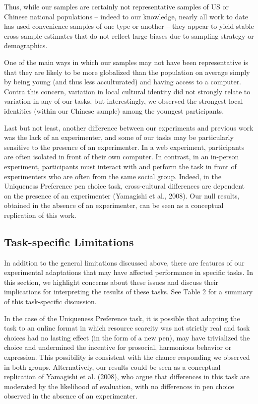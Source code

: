 \documentclass[
  man,floatsintext]{apa6}
\begin{document}
Thus, while our samples are certainly not representative samples of US or Chinese national populations -- indeed to our knowledge, nearly all work to date has used convenience samples of one type or another -- they appear to yield stable cross-sample estimates that do not reflect large biases due to sampling strategy or demographics.

One of the main ways in which our samples may not have been representative is that they are likely to be more globalized than the population on average simply by being young (and thus less acculturated) and having access to a computer. Contra this concern, variation in local cultural identity did not strongly relate to variation in any of our tasks, but interestingly, we observed the strongest local identities (within our Chinese sample) among the youngest participants.

Last but not least, another difference between our experiments and previous work was the lack of an experimenter, and some of our tasks may be particularly sensitive to the presence of an experimenter. In a web experiment, participants are often isolated in front of their own computer. In contrast, in an in-person experiment, participants must interact with and perform the task in front of experimenters who are often from the same social group. Indeed, in the Uniqueness Preference pen choice task, cross-cultural differences are dependent on the presence of an experimenter (Yamagishi et al., 2008). Our null results, obtained in the absence of an experimenter, can be seen as a conceptual replication of this work.

\hypertarget{task-specific-limitations}{%
\subsection{Task-specific Limitations}\label{task-specific-limitations}}

In addition to the general limitations discussed above, there are features of our experimental adaptations that may have affected performance in specific tasks. In this section, we highlight concerns about these issues and discuss their implications for interpreting the results of these tasks. See Table 2 for a summary of this task-specific discussion.

In the case of the Uniqueness Preference task, it is possible that adapting the task to an online format in which resource scarcity was not strictly real and task choices had no lasting effect (in the form of a new pen), may have trivialized the choice and undermined the incentive for prosocial, harmonious behavior or expression. This possibility is consistent with the chance responding we observed in both groups. Alternatively, our results could be seen as a conceptual replication of Yamagishi et al. (2008), who argue that differences in this task are moderated by the likelihood of evaluation, with no differences in pen choice observed in the absence of an experimenter.
\end{document}
